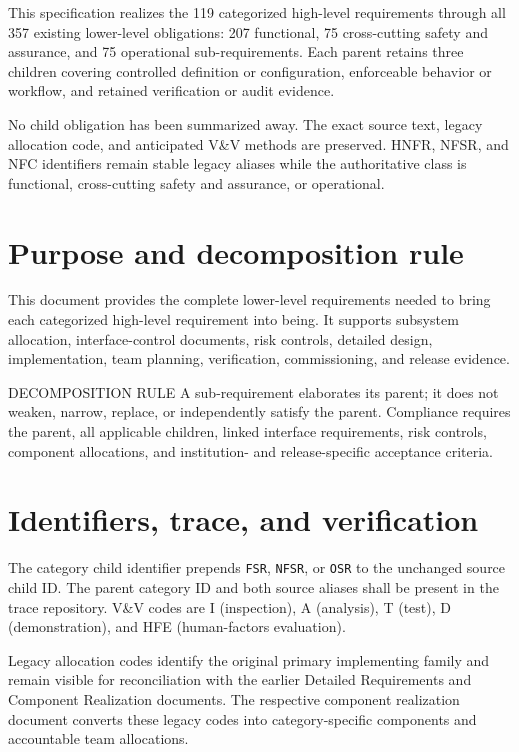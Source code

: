 \documentclass[11pt,letterpaper]{article}
\begin{document}

This specification realizes the 119 categorized high-level requirements through all 357 existing lower-level obligations: 207 functional, 75 cross-cutting safety and assurance, and 75 operational sub-requirements. Each parent retains three children covering controlled definition or configuration, enforceable behavior or workflow, and retained verification or audit evidence.

No child obligation has been summarized away. The exact source text, legacy allocation code, and anticipated V\&V methods are preserved. HNFR, NFSR, and NFC identifiers remain stable legacy aliases while the authoritative class is functional, cross-cutting safety and assurance, or operational.

\section{Purpose and decomposition rule}

This document provides the complete lower-level requirements needed to bring each categorized high-level requirement into being. It supports subsystem allocation, interface-control documents, risk controls, detailed design, implementation, team planning, verification, commissioning, and release evidence.

\begin{nlnotice}{DECOMPOSITION RULE}
A sub-requirement elaborates its parent; it does not weaken, narrow, replace, or independently satisfy the parent. Compliance requires the parent, all applicable children, linked interface requirements, risk controls, component allocations, and institution- and release-specific acceptance criteria.
\end{nlnotice}

\section{Identifiers, trace, and verification}

The category child identifier prepends \texttt{FSR}, \texttt{NFSR}, or \texttt{OSR} to the unchanged source child ID. The parent category ID and both source aliases shall be present in the trace repository. V\&V codes are I (inspection), A (analysis), T (test), D (demonstration), and HFE (human-factors evaluation).

Legacy allocation codes identify the original primary implementing family and remain visible for reconciliation with the earlier Detailed Requirements and Component Realization documents. The respective component realization document converts these legacy codes into category-specific components and accountable team allocations.
\end{document}
